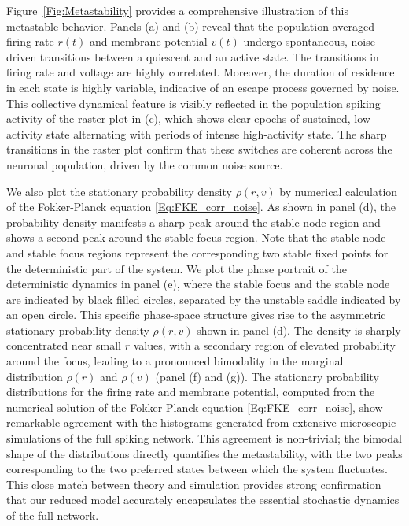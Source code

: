 \documentclass[aps,twocolumn,pre]{revtex4-2}
\begin{document}
Figure~\ref{Fig:Metastability} provides a comprehensive illustration of this metastable behavior. Panels (a) and (b) reveal that the population-averaged firing rate $r(t)$ and membrane potential $v(t)$ undergo spontaneous, noise-driven transitions between a quiescent and an active state. The transitions in firing rate and voltage are highly correlated. Moreover, the duration of residence in each state is highly variable, indicative of an escape process governed by noise. This collective dynamical feature is visibly reflected in the population spiking activity of the raster plot in (c), which shows clear epochs of sustained, low-activity state alternating with periods of intense high-activity state. The sharp transitions in the raster plot confirm that these switches are coherent across the neuronal population, driven by the common noise source.

We also plot the stationary probability density $\rho(r,v)$ by numerical calculation of the Fokker-Planck equation \eqref{Eq:FKE_corr_noise}. As shown in panel (d), the probability density manifests a sharp peak around the stable node region and shows a second peak around the stable focus region. Note that the stable node and stable focus regions represent the corresponding two stable fixed points for the deterministic part of the system. We plot the phase portrait of the deterministic dynamics in panel (e), where the stable focus and the stable node are indicated by black filled circles, separated by the unstable saddle indicated by an open circle. This specific phase-space structure gives rise to the asymmetric stationary probability density $\rho(r,v)$ shown in panel (d). The density is sharply concentrated near small $r$ values, with a secondary region of elevated probability around the focus, leading to a pronounced bimodality in the marginal distribution $\rho(r)$ and $\rho(v)$ (panel (f) and (g)). The stationary probability distributions for the firing rate and membrane potential, computed from the numerical solution of the Fokker-Planck equation \eqref{Eq:FKE_corr_noise}, show remarkable agreement with the histograms generated from extensive microscopic simulations of the full spiking network. This agreement is non-trivial; the bimodal shape of the distributions directly quantifies the metastability, with the two peaks corresponding to the two preferred states between which the system fluctuates. This close match between theory and simulation provides strong confirmation that our reduced model accurately encapsulates the essential stochastic dynamics of the full network. 
\end{document}
